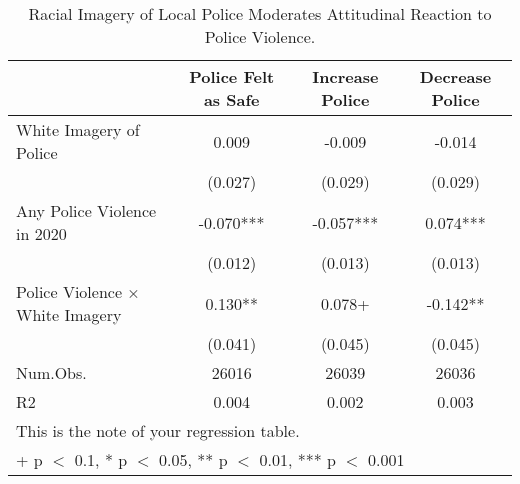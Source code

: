 \begin{table}

\caption{Racial Imagery of Local Police Moderates Attitudinal Reaction to Police Violence.}
\centering
\begin{tabular}[t]{lccc}
\toprule
  & Police Felt as Safe & Increase Police & Decrease Police\\
\midrule
White Imagery of Police & 0.009 & -0.009 & -0.014\\
 & (0.027) & (0.029) & (0.029)\\
Any Police Violence in 2020 & -0.070*** & -0.057*** & 0.074***\\
 & (0.012) & (0.013) & (0.013)\\
Police Violence × White Imagery & 0.130** & 0.078+ & -0.142**\\
 & (0.041) & (0.045) & (0.045)\\
\midrule
Num.Obs. & 26016 & 26039 & 26036\\
R2 & 0.004 & 0.002 & 0.003\\
\bottomrule
\multicolumn{4}{l}{\rule{0pt}{1em}This is the note of your regression table.}\\
\multicolumn{4}{l}{\rule{0pt}{1em}+ p $<$ 0.1, * p $<$ 0.05, ** p $<$ 0.01, *** p $<$ 0.001}\\
\end{tabular}
\end{table}
